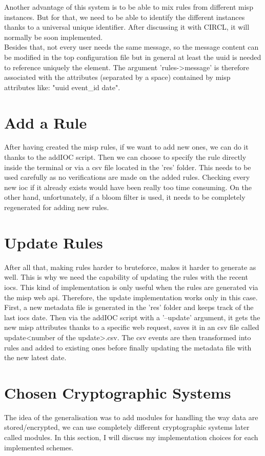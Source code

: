\documentclass{eplmastersthesis}
\begin{document}
Another advantage of this system is to be able to mix rules from different \gls{misp} instances. But for that, we need to be able to identify the different instances thanks to a universal unique identifier. After discussing it with CIRCL, it will normally be soon implemented.\\

Besides that, not every user needs the same message, so the message content can be modified in the top configuration file but in general at least the \gls{uuid} is needed to reference uniquely the element.
The argument 'rules->message' is therefore associated with the attributes (separated by a space) contained by \gls{misp} attributes like: "uuid event\_id date".

\section{Add a Rule}
\label{sec:AddRule}
After having created the \gls{misp} rules, if we want to add new ones, we can do it thanks to the addIOC script.
Then we can choose to specify the rule directly inside the terminal or via a \gls{csv} file located in the 'res' folder.
This needs to be used carefully as no verifications are made on the added rules. Checking every new \gls{ioc} if it already exists would have been really too time consuming.
On the other hand, unfortunately, if a bloom filter is used, it needs to be completely regenerated for adding new rules.

\section{Update Rules}
After all that, making rules harder to bruteforce, makes it harder to generate as well. This is why we need the capability of updating the rules with the recent \glspl{ioc}.
This kind of implementation is only useful when the rules are generated via the \gls{misp} web \gls{api}. Therefore, the update implementation works only in this case.
First, a new metadata file is generated in the 'res' folder and keeps track of the last \glspl{ioc} date. Then via the addIOC script with a '--update' argument, it gets the new \gls{misp} attributes thanks to a specific web request, saves it in an \gls{csv} file called update<number of the update>.csv.
The \gls{csv} events are then transformed into rules and added to existing ones before finally updating the metadata file with the new latest date.

\section{Chosen Cryptographic Systems}
The idea of the generalisation was to add modules for handling the way data are stored/encrypted, we can use completely different cryptographic systems later called modules. In this section, I will discuss my implementation choices for each implemented schemes.
\end{document}
